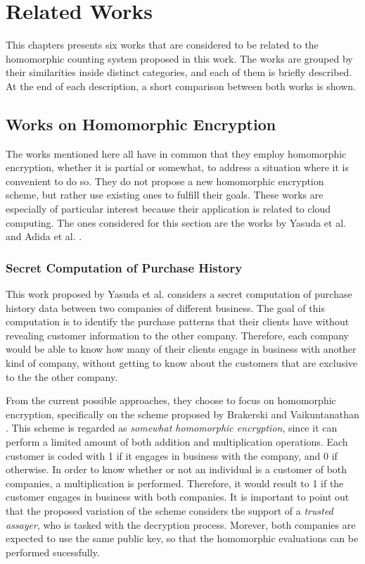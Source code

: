\chapter{Related Works}
\label{relatedWorks}

This chapters presents six works that are considered to be related to the homomorphic counting system proposed in this work. The works are grouped by their similarities inside distinct categories, and each of them is briefly described. At the end of each description, a short comparison between both works is shown. 

\section{{Works on Homomorphic Encryption}}
The works mentioned here all have in common that they employ homomorphic encryption, whether it is partial or somewhat, to address a situation where it is convenient to do so. They do not propose a new homomorphic encryption scheme, but rather use existing ones to fulfill their goals. These works are especially of particular interest because their application is related to cloud computing. The ones considered for this section are the works by Yasuda et al. \cite{Yasuda:2015:SDD:2732516.2732521, yasuda2014} and Adida et al. \cite{adida2008helios}.

\subsection{Secret Computation of Purchase History}
This work proposed by Yasuda et al. \cite{yasuda2014} considers a secret computation of purchase history data between two companies of different business. The goal of this computation is to identify the purchase patterns that their clients have without revealing customer information to the other company. Therefore, each company would be able to know how many of their clients engage in business with another kind of company, without getting to know about the customers that are exclusive to the the other company.

From the current possible approaches, they choose to focus on homomorphic encryption, specifically on the scheme proposed by Brakerski and Vaikuntanathan \cite{cryptoeprint:2011:277}. This scheme is regarded as \emph{somewhat homomorphic encryption}, since it can perform a limited amount of both addition and multiplication operations. Each customer is coded with 1 if it engages in business with the company, and 0 if otherwise. In order to know whether or not an individual is a customer of both companies, a multiplication is performed. Therefore, it would result to 1 if the customer engages in business with both companies. It is important to point out that the proposed variation of the scheme considers the support of a \emph{trusted assayer}, who is tasked with the decryption process. Morever, both companies are expected to use the same public key, so that the homomorphic evaluations can be performed sucessfully.

